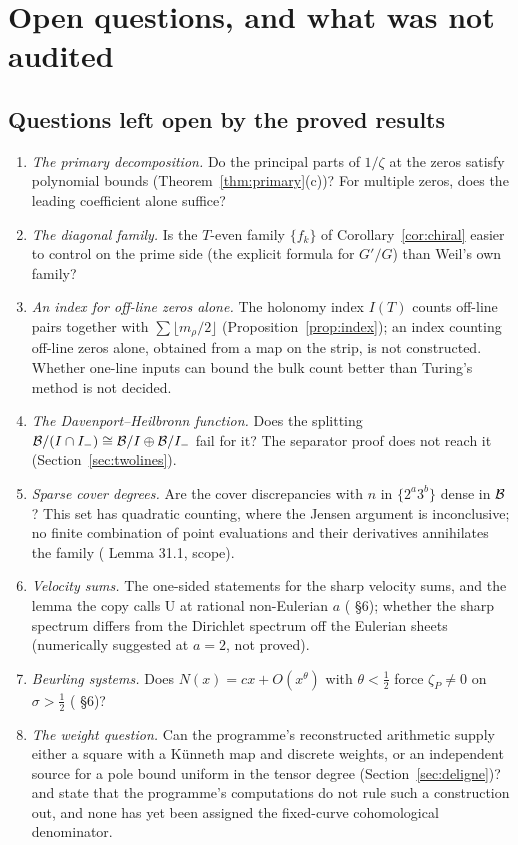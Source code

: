 \section{Open questions, and what was not audited}\label{sec:open}

\subsection{Questions left open by the proved results}

\begin{enumerate}[label=\arabic*.]
\item \emph{The primary decomposition.} Do the principal parts of $1/\zeta$ at the zeros satisfy polynomial bounds (Theorem~\ref{thm:primary}(c))? For multiple zeros, does the leading coefficient alone suffice?
\item \emph{The diagonal family.} Is the $T$-even family $\{f_k\}$ of Corollary~\ref{cor:chiral} easier to control on the prime side (the explicit formula for $G'/G$) than Weil's own family?
\item \emph{An index for off-line zeros alone.} The holonomy index $I(T)$ counts off-line pairs together with $\sum\lfloor m_\rho/2\rfloor$ (Proposition~\ref{prop:index}); an index counting off-line zeros alone, obtained from a map on the strip, is not constructed. Whether one-line inputs can bound the bulk count better than Turing's method is not decided.
\item \emph{The Davenport--Heilbronn function.} Does the splitting $\mathcal{B}/(I\cap I_-)\cong\mathcal{B}/I\oplus\mathcal{B}/I_-$ fail for it? The separator proof does not reach it (Section~\ref{sec:twolines}).
\item \emph{Sparse cover degrees.} Are the cover discrepancies with $n$ in $\{2^a3^b\}$ dense in $\mathcal{B}$? This set has quadratic counting, where the Jensen argument is inconclusive; no finite combination of point evaluations and their derivatives annihilates the family ( Lemma 31.1, scope).
\item \emph{Velocity sums.} The one-sided statements for the sharp velocity sums, and the lemma the copy calls U at rational non-Eulerian $a$ ( §6); whether the sharp spectrum differs from the Dirichlet spectrum off the Eulerian sheets (numerically suggested at $a=2$, not proved).
\item \emph{Beurling systems.} Does $N(x)=cx+O(x^\theta)$ with $\theta<\tfrac12$ force $\zeta_P\ne0$ on $\sigma>\tfrac12$ ( §6)?
\item \emph{The weight question.} Can the programme's reconstructed arithmetic supply either a square with a Künneth map and discrete weights, or an independent source for a pole bound uniform in the tensor degree (Section~\ref{sec:deligne})?  and  state that the programme's computations do not rule such a construction out, and none has yet been assigned the fixed-curve cohomological denominator.

\end{enumerate}
